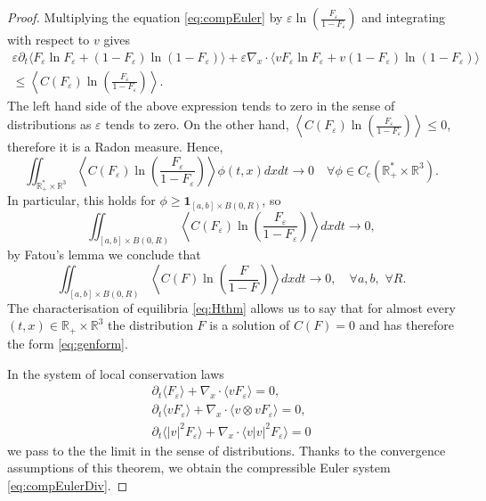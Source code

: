 \begin{proof}
Multiplying the equation \eqref{eq:compEuler} by $\varepsilon
\ln\left(\frac{F_\varepsilon}
{1-F_\varepsilon}\right)$ and integrating with respect to $v$ gives
 \begin{multline}\label{ineq:entr}\varepsilon\partial_t\langle   F_\varepsilon\ln F_\varepsilon + 
(1-F_\varepsilon)\ln (1-F_\varepsilon) \rangle+
\varepsilon\nabla_x\cdot\langle v F_\varepsilon\ln F_\varepsilon +
 v(1-F_\varepsilon)\ln (1-F_\varepsilon) \rangle\\\le \left\langle
C(F_\varepsilon)\ln\left(\frac{F_\varepsilon}
{1-F_\varepsilon}\right)\right\rangle.\end{multline} 
The left hand side of the above expression tends to zero in the sense of distributions as $\varepsilon$ tends to zero. On the other hand, $\left\langle
C(F_\varepsilon)\ln\left(\frac{F_\varepsilon}
{1-F_\varepsilon}\right)\right\rangle\le 0$, therefore it is a Radon measure. Hence, 
\begin{equation*}
	\iint_{\mathbb R^\ast_+\times \mathbb R^3}\left\langle
C(F_\varepsilon)\ln\left(\frac{F_\varepsilon}
{1-F_\varepsilon}\right)\right\rangle\phi(t,x)dxdt\to 0 \quad \forall \phi \in C_c(\mathbb R^\ast_+\times \mathbb R^3).
\end{equation*}In particular, this holds for $\phi\ge \mathbf 1_{[a,b]\times B(0,R)}$, so
\begin{equation*}
	\iint_{[a,b]\times B(0,R)}\left\langle
C(F_\varepsilon)\ln\left(\frac{F_\varepsilon}
{1-F_\varepsilon}\right)\right\rangle dxdt\to 0,
\end{equation*}
by Fatou's lemma we conclude that \begin{equation*}
	\iint_{[a,b]\times B(0,R)}\left\langle
C(F )\ln\left(\frac{F }
{1-F }\right)\right\rangle dxdt\to 0,\quad \forall a,b,\,\,\forall R.
\end{equation*}
The characterisation of equilibria \eqref{eq:Hthm} allows us to say that for almost
every 
$(t, x)\in \mathbb R_+\times \mathbb R^3$ the distribution $F$ is a solution of $C(F)=0$ and has therefore the form
\eqref{eq:genform}.



In the system of local conservation laws 
\begin{equation}
\begin{array}{rl}
	\partial_t\langle F_\varepsilon\rangle+\nabla_x\cdot \langle v
F_\varepsilon\rangle=0,\\
	\partial_t\langle vF_\varepsilon\rangle+\nabla_x\cdot \langle v\otimes v
F_\varepsilon\rangle=0,\\
	\partial_t\langle |v|^2F_\varepsilon\rangle+\nabla_x\cdot \langle v|v|^2
F_\varepsilon\rangle=0
\end{array}
\end{equation}
we pass to the the limit in the sense of distributions. Thanks to the convergence assumptions of this theorem, we obtain 
the compressible Euler system \eqref{eq:compEulerDiv}.


\end{proof}
